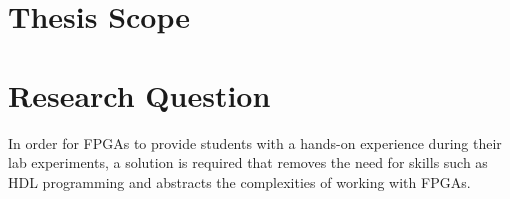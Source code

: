 \documentclass[openright]{template/uva-bachelor-thesis}
\begin{document}





\section{Thesis Scope}



\section{Research Question}

In order for FPGAs to provide students with a hands-on experience during their lab experiments, a solution is required 
that removes the need for skills such as HDL programming and abstracts the complexities of working with FPGAs.
\end{document}
